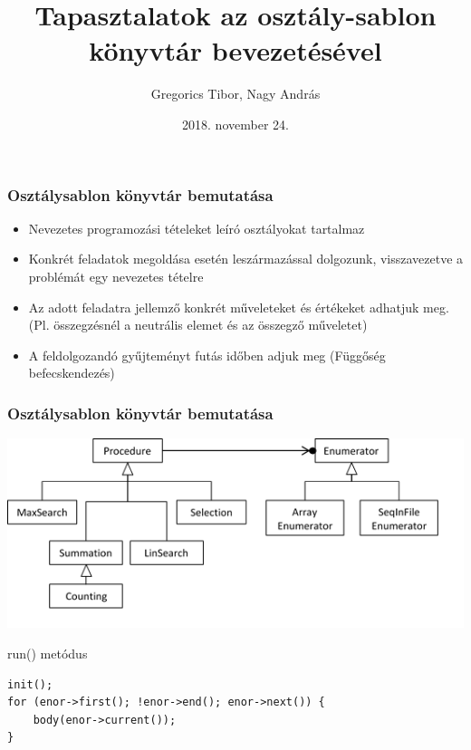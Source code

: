 \documentclass[11pt]{beamer}
\author{Gregorics Tibor, Nagy András}
\title{Tapasztalatok az osztály-sablon könyvtár bevezetésével}
\date{2018. november 24.}
\begin{document}
\begin{frame}
\titlepage
\end{frame}

\begin{frame}
	\frametitle{Osztálysablon könyvtár bemutatása}
	
	\begin{itemize}
		\item Nevezetes programozási tételeket leíró osztályokat tartalmaz
		\item Konkrét feladatok megoldása esetén leszármazással dolgozunk, visszavezetve a problémát egy nevezetes tételre
		\item Az adott feladatra jellemző konkrét műveleteket és értékeket adhatjuk meg. (Pl. összegzésnél a neutrális elemet és az összegző műveletet)
		\item A feldolgozandó gyűjteményt futás időben adjuk meg (Függőség befecskendezés)
	\end{itemize}
\end{frame}

\begin{frame}[fragile]
	\frametitle{Osztálysablon könyvtár bemutatása}
	\includegraphics[scale=0.8]{sablon_hiearhica.png}
	
	\begin{block}{run() metódus}
		\begin{lstlisting}[basicstyle=\small]
init();
for (enor->first(); !enor->end(); enor->next()) {
    body(enor->current());
}
		\end{lstlisting}
	\end{block}
	
\end{frame}
\end{document}
